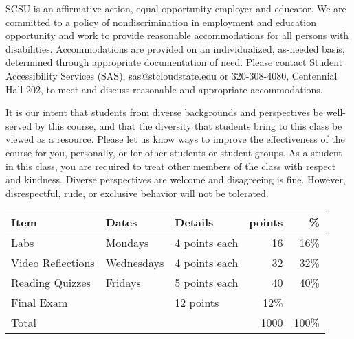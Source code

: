 \documentclass{tufte-handout}
\begin{document}
\begin{fullwidth}

\newpage


 SCSU is an affirmative action, equal opportunity employer and educator. We are committed to a policy of nondiscrimination in employment and education opportunity and work to provide reasonable accommodations for all persons with disabilities. Accommodations are provided on an individualized, as-needed basis, determined through appropriate documentation of need. Please contact Student Accessibility Services (SAS), sas@stcloudstate.edu or 320-308-4080, Centennial Hall 202, to meet and discuss reasonable and appropriate accommodations. 

 It is our intent that students from diverse backgrounds and perspectives be well-served by this course, and that the diversity that students bring to this class be viewed as a resource. Please let us know ways to improve the effectiveness of the course for you, personally, or for other students or student groups. As a student in this class, you are required to treat other members of the class with respect and kindness. Diverse perspectives are welcome and disagreeing is fine. However, disrespectful, rude, or exclusive behavior will not be tolerated.




\end{fullwidth}




\begin{table}
\begin{tabular}{l l l r r }
Item & Dates & Details & points &  \% \\
\hline
Labs & Mondays & 4 points each & 16 & 16\% \\
Video Reflections  & Wednesdays & 4 points each & 32 & 32\% \\
Reading Quizzes & Fridays & 5 points each & 40 & 40\% \\
Final Exam & & 12 points & 12\% \\
\hline
Total & & & 1000 & 100\% \\
\end{tabular}
\end{table}
\end{document}
